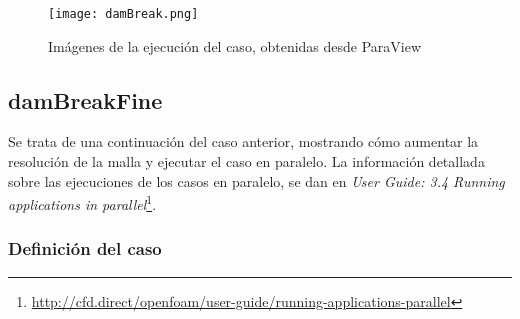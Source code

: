 \begin{figure}[hb]
\centering
\texttt{[image: damBreak.png]}
\caption[Animación del caso]{Imágenes de la ejecución del caso, obtenidas desde ParaView}
\label{fig:damBreak}
\end{figure}

\subsection{damBreakFine}\label{header-n674}

Se trata de una continuación del caso anterior, mostrando cómo aumentar
la resolución de la malla y ejecutar el caso en paralelo. La información
detallada sobre las ejecuciones de los casos en paralelo, se dan en \emph{User
Guide: 3.4 Running applications in parallel}\footnote{\url{http://cfd.direct/openfoam/user-guide/running-applications-parallel}}.

\subsubsection{Definición del caso}\label{header-n679}

